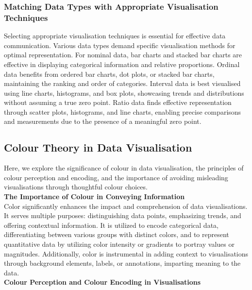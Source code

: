 \documentclass{article}\usepackage[]{graphicx}\usepackage[]{xcolor}
\begin{document}
\subsubsection{Matching Data Types with Appropriate Visualisation Techniques}

Selecting appropriate visualisation techniques is essential for effective data communication. Various data types demand specific visualisation methods for optimal representation. For nominal data, bar charts and stacked bar charts are effective in displaying categorical information and relative proportions. Ordinal data benefits from ordered bar charts, dot plots, or stacked bar charts, maintaining the ranking and order of categories. Interval data is best visualised using line charts, histograms, and box plots, showcasing trends and distributions without assuming a true zero point. Ratio data finds effective representation through scatter plots, histograms, and line charts, enabling precise comparisons and measurements due to the presence of a meaningful zero point.

\subsection{Colour Theory in Data Visualisation}

Here, we explore the significance of colour in data visualisation, the principles of colour perception and encoding, and the importance of avoiding misleading visualisations through thoughtful colour choices.\\

\noindent 
\textbf{The Importance of Colour in Conveying Information}\\

\noindent
Color significantly enhances the impact and comprehension of data visualisations. It serves multiple purposes: distinguishing data points, emphasizing trends, and offering contextual information. It is utilized to encode categorical data, differentiating between various groups with distinct colors, and to represent quantitative data by utilizing color intensity or gradients to portray values or magnitudes. Additionally, color is instrumental in adding context to visualisations through background elements, labels, or annotations, imparting meaning to the data.\\

\noindent 
\textbf{Colour Perception and Colour Encoding in Visualisations}\\
\end{document}

